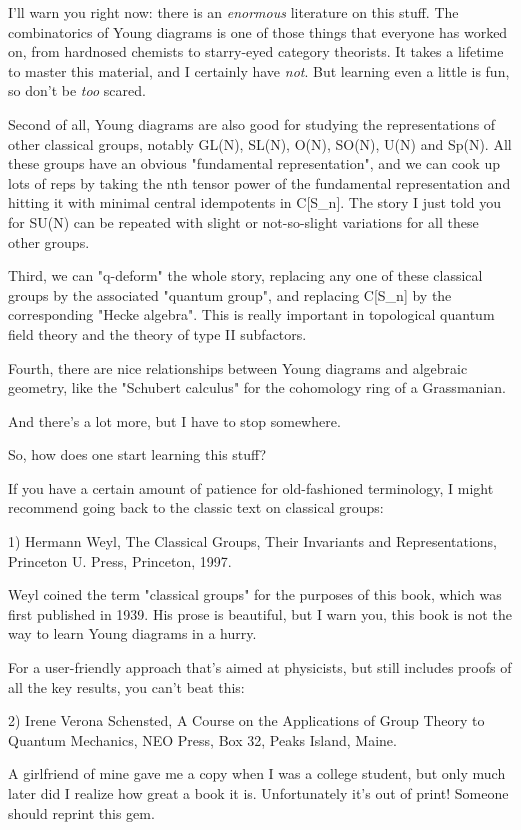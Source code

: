 I'll warn you right now: there is an \emph{enormous} literature on this
stuff.  The combinatorics of Young diagrams is one of those things that
everyone has worked on, from hardnosed chemists to starry-eyed category
theorists.  It takes a lifetime to master this material, and I certainly
have \emph{not}.  But learning even a little is fun, so don't 
be \emph{too} scared.

Second of all, Young diagrams are also good for studying the
representations of other classical groups, notably GL(N), SL(N), O(N),
SO(N), U(N) and Sp(N).  All these groups have an obvious "fundamental
representation", and we can cook up lots of reps by taking the nth
tensor power of the fundamental representation and hitting it with
minimal central idempotents in C[S_{n}].  The story I just told you for
SU(N) can be repeated with slight or not-so-slight variations for all
these other groups.

Third, we can "q-deform" the whole story, replacing any one of
these classical groups by the associated "quantum group", and
replacing C[S_{n}] by the corresponding "Hecke
algebra".  This is really important in topological quantum field
theory and the theory of type II subfactors.

Fourth, there are nice relationships between Young diagrams and 
algebraic geometry, like the "Schubert calculus" for the cohomology 
ring of a Grassmanian.

And there's a lot more, but I have to stop somewhere.

So, how does one start learning this stuff?

If you have a certain amount of patience for old-fashioned terminology,
I might recommend going back to the classic text on classical groups:

1) Hermann Weyl, The Classical Groups, Their Invariants and Representations,
Princeton U. Press, Princeton, 1997.

Weyl coined the term "classical groups" for the purposes of this book,
which was first published in 1939.  His prose is beautiful, but I warn
you, this book is not the way to learn Young diagrams in a hurry.

For a user-friendly approach that's aimed at physicists, but still
includes proofs of all the key results, you can't beat this:

2) Irene Verona Schensted, A Course on the Applications of Group Theory
to Quantum Mechanics, NEO Press, Box 32, Peaks Island, Maine.

A girlfriend of mine gave me a copy when I was a college student, but
only much later did I realize how great a book it is.  Unfortunately
it's out of print!  Someone should reprint this gem.

